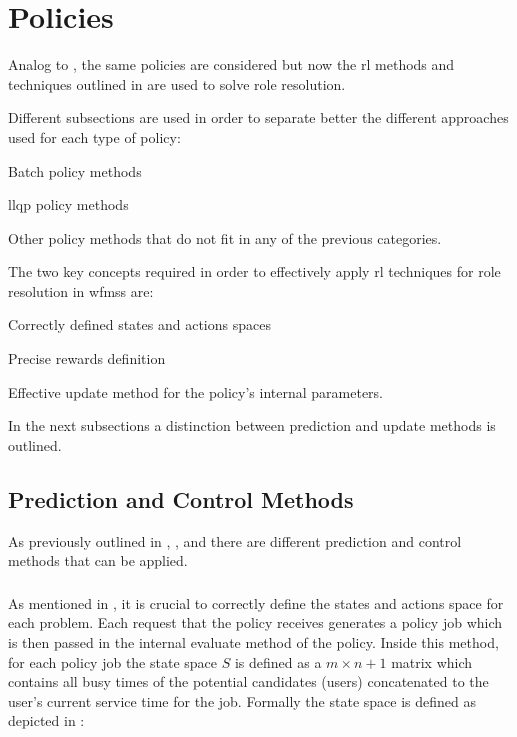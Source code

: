 \section{ Policies}
\label{sec:rl_policies}

Analog to , the same policies are considered but now the \gls{rl} methods and techniques outlined in  are used to solve role resolution.

Different subsections are used in order to separate better the different approaches used for each type of policy:
\begin{enumerate*}
	\item Batch policy methods
	\item \gls{llqp} policy methods
	\item Other policy methods that do not fit in any of the previous categories.
\end{enumerate*}

The two key concepts required in order to effectively apply \gls{rl} techniques for role resolution in \glspl{wfms} are:
\begin{enumerate*}
	\item Correctly defined states and actions spaces
	\item Precise rewards definition
	\item Effective update method for the policy's internal parameters. 
\end{enumerate*}

In the next subsections a distinction between prediction and update methods is outlined.

\subsection{Prediction and Control Methods}

As previously outlined in , ,  and  there are different prediction and control methods that can be applied.

\subsubsection{}

As mentioned in , it is crucial to correctly define the states and actions space for each problem. Each request that the policy receives generates a policy job which is then passed in the internal evaluate method of the policy. Inside this method, for each policy job the state space $S$ is defined as a $m \times n+1$ matrix which contains all busy times of the potential candidates (\ie users) concatenated to the user's current service time for the job. Formally the state space is defined as depicted in :

